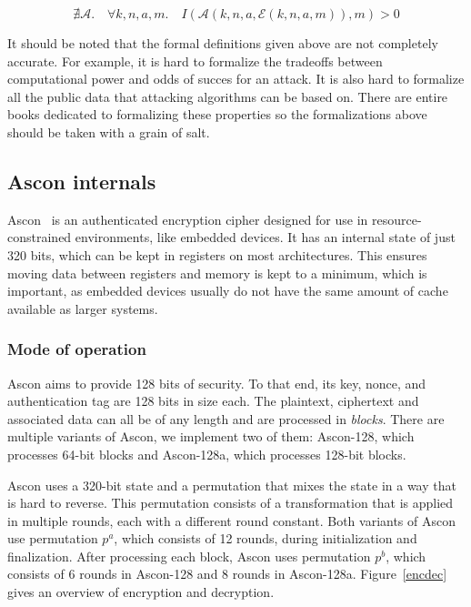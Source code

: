 \begin{equation}
    \nexists \mathcal{A}.\quad \forall k, n, a, m.\quad
    I(\mathcal{A}(k, n, a, \mathcal{E}(k, n, a, m)), m) > 0
\end{equation}

It should be noted that the formal definitions given above are not completely
accurate. For example, it is hard to formalize the tradeoffs between
computational power and odds of succes for an attack. It is also hard to
formalize all the public data that attacking algorithms can be based on. There
are entire books dedicated to formalizing these properties so the formalizations
above should be taken with a grain of salt.

\subsection{Ascon internals}

Ascon~\cite{ascon} is an authenticated encryption cipher designed for use in
resource-constrained environments, like embedded devices. It has an internal
state of just 320 bits, which can be kept in registers on most architectures.
This ensures moving data between registers and memory is kept to a minimum,
which is important, as embedded devices usually do not have the same amount of
cache available as larger systems.

\subsubsection{Mode of operation}

Ascon aims to provide 128 bits of security. To that end, its key, nonce, and
authentication tag are 128 bits in size each. The plaintext, ciphertext and
associated data can all be of any length and are processed in \emph{blocks}.
There are multiple variants of Ascon, we implement two of them: Ascon-128, which
processes 64-bit blocks and Ascon-128a, which processes 128-bit blocks.

Ascon uses a 320-bit state and a permutation that mixes the state in a way that
is hard to reverse. This permutation consists of a transformation that is
applied in multiple rounds, each with a different round constant. Both variants
of Ascon use permutation $p^a$, which consists of 12 rounds, during
initialization and finalization. After processing each block, Ascon uses
permutation $p^b$, which consists of 6 rounds in Ascon-128 and 8 rounds in
Ascon-128a. Figure~\ref{encdec} gives an overview of encryption and decryption.

